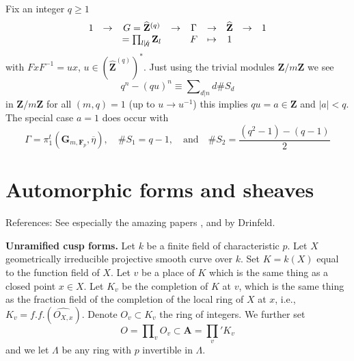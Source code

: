 \begin{example}
\label{example-commutative}
Fix an integer $q\geq 1$
$$
\begin{matrix}
1 &
\to &
G = \widehat{\mathbf{Z}}^{(q)} &
\to &
\Gamma &
\to &
\widehat{\mathbf{Z}} &
\to &
1 \\
&
&
= \prod_{l\not \mid q} \mathbf{Z}_l &
&
F &
\mapsto &
1
\end{matrix}
$$
with $FxF^{-1} = ux$, $u \in (\widehat{\mathbf{Z}}^{(q)})^*$.
Just using the trivial modules
$\mathbf{Z}/m\mathbf{Z}$ we see
$$
q^n - (qu)^n \equiv \sum\nolimits_{d|n} d\# S_d
$$
in $\mathbf{Z}/m\mathbf{Z}$ for all $(m, q)=1$ (up to
$u \to u^{-1}$) this implies $qu = a\in \mathbf{Z}$
and $|a| < q$. The special case $a = 1$ does occur with
$$
\Gamma = \pi_1^t(\mathbf{G}_{m, \mathbf{F}_p}, \overline \eta),
\quad
\# S_1 = q - 1,
\quad\text{and}\quad
\# S_2 = \frac{(q^2-1)-(q-1)}{2}
$$
\end{example}



\section{Automorphic forms and sheaves}
\label{section-automorphic}

\noindent
References: See especially the amazing papers
\cite{D1}, \cite{D2} and \cite{D0} by Drinfeld.

\medskip\noindent
{\bf Unramified cusp forms.}
Let $k$ be a finite field of characteristic $p$.
Let $X$ geometrically irreducible projective smooth curve over $k$.
Set $K = k(X)$ equal to the function field of $X$.
Let $v$ be a place of $K$ which is the same thing as a
closed point $x\in X$. Let $K_v$ be the completion of $K$ at $v$, which
is the same thing as the fraction field of the completion of
the local ring of $X$ at $x$, i.e., $K_v = f.f.(\widehat{O_{X, x}})$.
Denote $O_v\subset K_v$ the ring of integers. We further set
$$
O = \prod\nolimits_v O_v \subset \mathbf{A} = \prod_v' K_v
$$
and we let $\Lambda$ be any ring with $p$ invertible in $\Lambda$.

